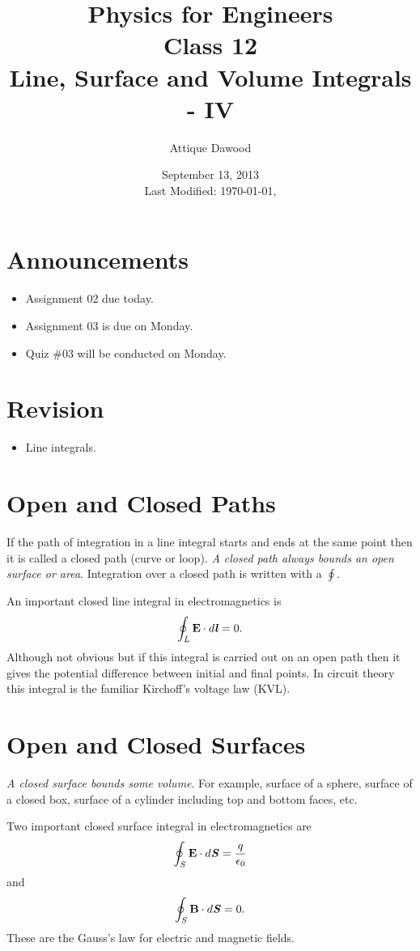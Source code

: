 \documentclass[12pt,a4paper]{article}
\title{\vspace{-2cm}Physics for Engineers\\Class 12\\Line, Surface and Volume Integrals - IV}
\author{Attique Dawood}
\date{September 13, 2013\\[0.2cm] Last Modified: \today, \currenttime}
\begin{document}
\maketitle
\section{Announcements}
\begin{itemize}
\item Assignment 02 due today.
\item Assignment 03 is due on Monday.
\item Quiz \#03 will be conducted on Monday.
\end{itemize}
\section{Revision}
\begin{itemize}
\item Line integrals.
\end{itemize}
\section{Open and Closed Paths}
If the path of integration in a line integral starts and ends at the same point then it is called a closed path (curve or loop). \textit{A closed path always bounds an open surface or area}. Integration over a closed path is written with a $\oint$.

An important closed line integral in electromagnetics is
\begin{equation}
\oint_L \textbf{E}\cdot d\textbf{\textit{l}}=0.
\end{equation}
Although not obvious but if this integral is carried out on an open path then it gives the potential difference between initial and final points. In circuit theory this integral is the familiar Kirchoff's voltage law (KVL).
\section{Open and Closed Surfaces}
\textit{A closed surface bounds some volume}. For example, surface of a sphere, surface of a closed box, surface of a cylinder including top and bottom faces, etc.

Two important closed surface integral in electromagnetics are
\begin{equation}
\oint_S \textbf{E}\cdot d\textbf{\textit{S}}=\dfrac{q}{\epsilon_0}
\end{equation}
and
\begin{equation}
\oint_S \textbf{B}\cdot d\textbf{\textit{S}}=0.
\end{equation}
These are the Gauss's law for electric and magnetic fields.
\end{document}
